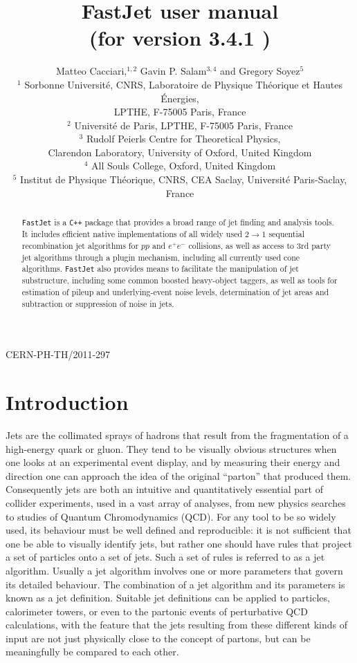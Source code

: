 \documentclass[12pt,a4]{article}
\title{\sf FastJet user manual%
  \\ \large (for version
  3.4.1%
  )
}
\author{Matteo Cacciari,$^{1,2}$ Gavin P. Salam$^{3,4}$ and Gregory Soyez$^{5}$\\[10pt]
  \normalsize
  $^1$ Sorbonne Universit\'e, CNRS, Laboratoire de Physique Th\'eorique et Hautes
  \'Energies,\\[-5pt] \normalsize LPTHE, F-75005 Paris, France\\
    \normalsize
  $^2$ Universit\'e de Paris, LPTHE, F-75005 Paris, France\\
  \normalsize
  $^3$ Rudolf Peierls Centre for Theoretical Physics,\\[-5pt]
  \normalsize
  Clarendon Laboratory, University of Oxford, United Kingdom\\
  \normalsize
  $^4$ All Souls College, Oxford, United Kingdom\\
  \normalsize
  $^5$ Institut de Physique Th\'eorique, CNRS, CEA Saclay, Universit\'e
  Paris-Saclay, France
}
\date{}
\newcommand{\fastjet}{\texttt{FastJet}\xspace}
\newcommand{\ttt}[1]{{\small\texttt{#1}}}
\begin{document}
\maketitle

\vspace{-10cm}
\begin{flushright}
  CERN-PH-TH/2011-297
\end{flushright}
\vspace{9cm}


\begin{abstract}

  \fastjet is a \ttt{C++} package that provides a broad range of jet
  finding and analysis tools.
  It includes efficient native implementations of all widely used $2\to 1$
  sequential recombination jet algorithms for $pp$ and $e^+e^-$
  collisions, as well as access to 3rd party jet algorithms through a
  plugin mechanism, including all currently used cone algorithms.
  \fastjet also provides means to facilitate the manipulation of jet
  substructure, including some common boosted heavy-object taggers, as
  well as tools for estimation of pileup and underlying-event noise
  levels, determination of jet areas and subtraction or suppression
  of noise in jets.

\end{abstract}

\newpage
\tableofcontents
\newpage

\section{Introduction}




Jets are the collimated sprays of hadrons that result from the
fragmentation of a high-energy quark or gluon.
%
They tend to be visually obvious structures when one looks at an
experimental event display, and by measuring their energy and
direction one can approach the idea of the original ``parton'' that
produced them.
%
Consequently jets are both an intuitive and quantitatively essential
part of collider experiments, used in a vast array of analyses, from
new physics searches to studies of Quantum Chromodynamics (QCD).
%
For any tool to be so widely used, its behaviour must be well defined
and reproducible: it is not sufficient that one be able to visually
identify jets, but rather one should have rules that project a set of
particles onto a set of jets.
%
Such a set of rules is referred to as a jet algorithm.
%
Usually a jet algorithm involves one or more parameters that govern
its detailed behaviour.
%
The combination of a jet algorithm and its parameters is known as a
jet definition.
%
Suitable jet definitions can be applied to particles,
calorimeter towers, or even to the partonic events of perturbative QCD
calculations, with the feature that the jets resulting from these
different kinds of input are not just physically close to the
concept of partons, but can be meaningfully be compared to each other.
\end{document}
